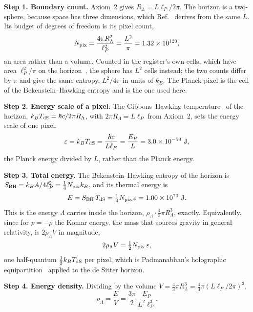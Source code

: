 \documentclass[aps,prd,twocolumn,superscriptaddress,nofootinbib,showkeys]{revtex4-2}
\begin{document}
\textbf{Step 1. Boundary count.} Axiom~2 gives $R_\Lambda = L\ell_P/2\pi$. The horizon is a two-sphere, because space has three dimensions, which Ref.~\cite{korytko2026d} derives from the same $L$. Its budget of degrees of freedom is its pixel count,
\begin{equation}
N_{\rm pix} = \frac{4\pi R_\Lambda^2}{\ell_P^2} = \frac{L^2}{\pi} = 1.32\times10^{123},
\label{eq:npix}
\end{equation}
an area rather than a volume. Counted in the register's own cells, which have area $\ell_P^2/\pi$ on the horizon~\cite{korytko2026d}, the sphere has $L^2$ cells instead; the two counts differ by $\pi$ and give the same entropy, $L^2/4\pi$ in units of $k_B$. The Planck pixel is the cell of the Bekenstein--Hawking entropy and is the one used here.

\textbf{Step 2. Energy scale of a pixel.} The Gibbons--Hawking temperature~\cite{gibbons1977} of the horizon, $k_BT_{\rm dS} = \hbar c/2\pi R_\Lambda$, with $2\pi R_\Lambda = L\ell_P$ from Axiom~2, sets the energy scale of one pixel,
\begin{equation}
\varepsilon = k_BT_{\rm dS} = \frac{\hbar c}{L\ell_P} = \frac{E_P}{L} = 3.0\times10^{-53}~{\rm J},
\label{eq:eps}
\end{equation}
the Planck energy divided by $L$, rather than the Planck energy.

\textbf{Step 3. Total energy.} The Bekenstein--Hawking entropy of the horizon is $S_{\rm BH} = k_BA/4\ell_P^2 = \tfrac14 N_{\rm pix}k_B$, and its thermal energy is
\begin{equation}
E = S_{\rm BH}\,T_{\rm dS} = \tfrac14 N_{\rm pix}\,\varepsilon = 1.00\times10^{70}~{\rm J}.
\label{eq:ETS}
\end{equation}
This is the energy $\Lambda$ carries inside the horizon, $\rho_\Lambda\cdot\tfrac43\pi R_\Lambda^3$, exactly. Equivalently, since for $p=-\rho$ the Komar energy, the mass that sources gravity in general relativity, is $2\rho_\Lambda V$ in magnitude,
\begin{equation}
2\rho_\Lambda V = \tfrac12 N_{\rm pix}\,\varepsilon,
\label{eq:equip}
\end{equation}
one half-quantum $\tfrac12 k_BT_{\rm dS}$ per pixel, which is Padmanabhan's holographic equipartition~\cite{padmanabhan2010,padmanabhan2014} applied to the de Sitter horizon.

\textbf{Step 4. Energy density.} Dividing by the volume $V = \tfrac43\pi R_\Lambda^3 = \tfrac43\pi(L\ell_P/2\pi)^3$,
\begin{equation}
\rho_\Lambda = \frac{E}{V} = \frac{3\pi}{2}\,\frac{E_P}{L^2\ell_P^3}.
\label{eq:rhoderived}
\end{equation}
\end{document}
